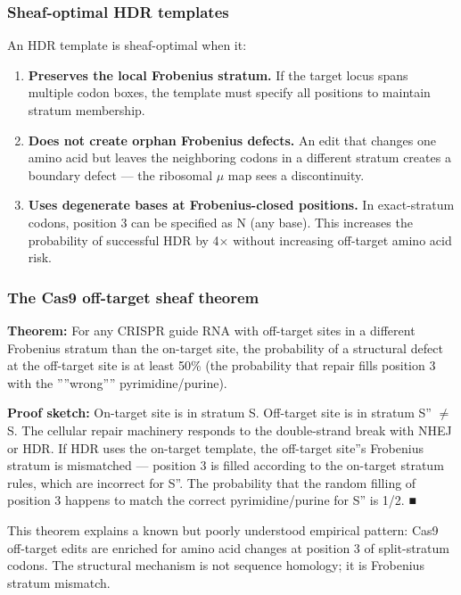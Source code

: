 \documentclass[12pt,a4paper]{article}
\begin{document}
\subsubsection{Sheaf-optimal HDR templates}

An HDR template is sheaf-optimal when it:

\begin{enumerate}
    \item \textbf{Preserves the local Frobenius stratum.} If the target locus spans multiple codon boxes, the template must specify all positions to maintain stratum membership.
    \item \textbf{Does not create orphan Frobenius defects.} An edit that changes one amino acid but leaves the neighboring codons in a different stratum creates a boundary defect --- the ribosomal $\mu$ map sees a discontinuity.
    \item \textbf{Uses degenerate bases at Frobenius-closed positions.} In exact-stratum codons, position 3 can be specified as N (any base). This increases the probability of successful HDR by 4$\times$ without increasing off-target amino acid risk.
\end{enumerate}

\subsubsection{The Cas9 off-target sheaf theorem}

\textbf{Theorem:} For any CRISPR guide RNA with off-target sites in a different Frobenius stratum than the on-target site, the probability of a structural defect at the off-target site is at least 50\% (the probability that repair fills position 3 with the ''''wrong'''' pyrimidine/purine).

\textbf{Proof sketch:} On-target site is in stratum S. Off-target site is in stratum S'' $\neq$ S. The cellular repair machinery responds to the double-strand break with NHEJ or HDR. If HDR uses the on-target template, the off-target site''s Frobenius stratum is mismatched --- position 3 is filled according to the on-target stratum rules, which are incorrect for S''. The probability that the random filling of position 3 happens to match the correct pyrimidine/purine for S'' is 1/2. ■

This theorem explains a known but poorly understood empirical pattern: Cas9 off-target edits are enriched for amino acid changes at position 3 of split-stratum codons. The structural mechanism is not sequence homology; it is Frobenius stratum mismatch.
\end{document}
